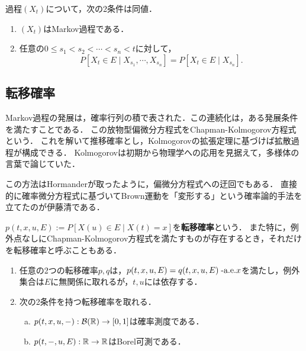\documentclass[uplatex,dvipdfmx]{jsreport}
\begin{document}
\begin{theorem}
    過程$(X_t)$について，次の2条件は同値．
    \begin{enumerate}
        \item $(X_t)$はMarkov過程である．
        \item 任意の$0\le s_1<s_2<\cdots<s_n<t$に対して，
        \[P[X_t\in E\mid X_{s_1},\cdots,X_{s_n}]=P[X_t\in E\mid X_{s_n}].\]
    \end{enumerate}
\end{theorem}

\subsection{転移確率}

\begin{tcolorbox}[colframe=ForestGreen, colback=ForestGreen!10!white,breakable,colbacktitle=ForestGreen!40!white,coltitle=black,fonttitle=\bfseries\sffamily,
title=熱核の半群性]
    Markov過程の発展は，確率行列の積で表された．この連続化は，ある発展条件を満たすことである．
    この放物型偏微分方程式をChapman-Kolmogorov方程式という．
    これを解いて推移確率とし，Kolmogorovの拡張定理に基づけば拡散過程が構成できる．
    Kolmogorovは初期から物理学への応用を見据えて，多様体の言葉で論じていた．

    この方法はHormanderが取ったように，偏微分方程式への迂回でもある．
    直接的に確率微分方程式に基づいてBrown運動を「変形する」という確率論的手法を立てたのが伊藤清である．
\end{tcolorbox}

\begin{definition}
    $p(t,x,u,E):=P[X(u)\in E\mid X(t)=x]$を\textbf{転移確率}という．
    また特に，例外点なしにChapman-Kolmogorov方程式を満たすものが存在するとき，それだけを転移確率と呼ぶこともある．
\end{definition}

\begin{lemma}\mbox{}
    \begin{enumerate}
        \item 任意の2つの転移確率$p,q$は，$p(t,x,u,E)=q(t,x,u,E)\;\text{-a.e.} x$を満たし，例外集合は$E$に無関係に取れるが，$t,u$には依存する．
        \item
    次の2条件を持つ転移確率を取れる．
    \begin{enumerate}[(a)]
        \item $p(t,x,u,-):\mathcal{B}(\mathbb{R})\to[0,1]$は確率測度である．
        \item $p(t,-,u,E):\mathbb{R}\to\mathbb{R}$はBorel可測である．
    \end{enumerate}
    \end{enumerate}
\end{lemma}
\end{document}
